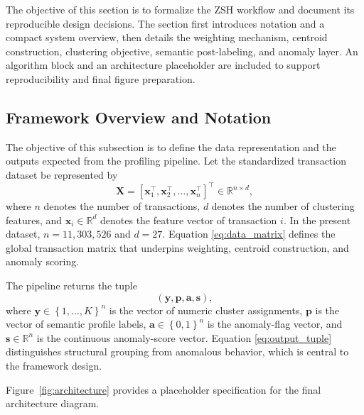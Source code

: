 \documentclass{ieeeaccess}
\begin{document}
The objective of this section is to formalize the ZSH workflow and document its reproducible design decisions. The section first introduces notation and a compact system overview, then details the weighting mechanism, centroid construction, clustering objective, semantic post-labeling, and anomaly layer. An algorithm block and an architecture placeholder are included to support reproducibility and final figure preparation.

\subsection{Framework Overview and Notation}

The objective of this subsection is to define the data representation and the outputs expected from the profiling pipeline. Let the standardized transaction dataset be represented by
\begin{equation}
\mathbf{X} = \left[\mathbf{x}_1^\top,\mathbf{x}_2^\top,\ldots,\mathbf{x}_n^\top\right]^\top \in \mathbb{R}^{n \times d},
\label{eq:data_matrix}
\end{equation}
where $n$ denotes the number of transactions, $d$ denotes the number of clustering features, and $\mathbf{x}_i \in \mathbb{R}^{d}$ denotes the feature vector of transaction $i$. In the present dataset, $n = 11{,}303{,}526$ and $d = 27$. Equation \eqref{eq:data_matrix} defines the global transaction matrix that underpins weighting, centroid construction, and anomaly scoring.

The pipeline returns the tuple
\begin{equation}
\left(\mathbf{y}, \mathbf{p}, \mathbf{a}, \mathbf{s}\right),
\label{eq:output_tuple}
\end{equation}
where $\mathbf{y} \in \left\{1,\ldots,K\right\}^{n}$ is the vector of numeric cluster assignments, $\mathbf{p}$ is the vector of semantic profile labels, $\mathbf{a} \in \left\{0,1\right\}^{n}$ is the anomaly-flag vector, and $\mathbf{s} \in \mathbb{R}^{n}$ is the continuous anomaly-score vector. Equation \eqref{eq:output_tuple} distinguishes structural grouping from anomalous behavior, which is central to the framework design.

Figure~\ref{fig:architecture} provides a placeholder specification for the final architecture diagram.
\end{document}
